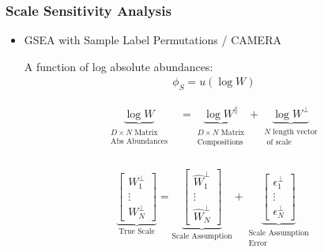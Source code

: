 \documentclass[11pt]{beamer}
\begin{document}
\begin{frame}
  \frametitle{Scale Sensitivity Analysis}

  \begin{itemize}
  \item GSEA with Sample Label Permutations / CAMERA

    A function of log absolute abundances:
    \begin{align*}
      \phi_S = u(\log W)
    \end{align*}

    \pause
    
    \begin{align*}
      \underbrace{\log W}_{\substack{D \times N \text{ Matrix} \\ \text{Abs Abundances}}} &= \underbrace{\log W^\parallel}_{\substack{D \times N \text{ Matrix} \\ \text{Compositions}}} + \underbrace{\log W^\perp}_{\substack{N \text{ length vector} \\ \text{ of scale}}} \\
    \end{align*}

    \pause

    \begin{align*}
      \underbrace{\begin{bmatrix}W^\perp_1 \\ \vdots \\ W^\perp_N \end{bmatrix}}_{\text{True Scale}} = \underbrace{\begin{bmatrix}\hat{W}^\perp_1 \\ \vdots \\ \hat{W}^\perp_N \end{bmatrix}}_{\text{Scale Assumption}} + \underbrace{\begin{bmatrix}\epsilon^\perp_1 \\ \vdots \\ \epsilon^\perp_N \end{bmatrix}}_{\substack{\text{Scale Assumption} \\ \text{Error}}}
    \end{align*}
  \end{itemize}
\end{frame}
\end{document}
